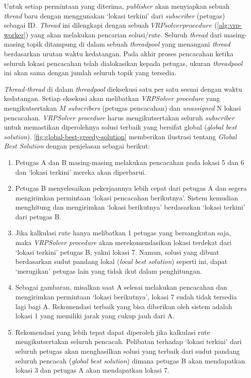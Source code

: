 Untuk setiap permintaan yang diterima, \textit{publisher} akan menyiapkan sebuah \textit{thread} baru dengan menggunakan `lokasi terkini' dari \textit{subscriber} (petugas) sebagai ID. \textit{Thread} ini dilengkapi dengan sebuah $VRP solver procedure$ (\autoref{alg:vrp-worker}) yang akan melakukan pencarian solusi/rute. Seluruh \textit{thread} dari masing-masing topik ditampung di dalam sebuah \textit{threadpool} yang menangani \textit{thread} berdasarkan urutan waktu kedatangan. Pada akhir proses pencacahan ketika seluruh lokasi pencacahan telah dialokasikan kepada petugas, ukuran \textit{threadpool} ini akan sama dengan jumlah seluruh topik yang tersedia. 


\textit{Thread-thread} di dalam \textit{threadpool} dieksekusi satu per satu sesuai dengan waktu kedatangan. Setiap eksekusi akan melibatkan \textit{VRPSolver procedure} yang mengikutsertakan $M$ \textit{subscribers} (petugas pencacahan) dan \textit{unassigned} N lokasi pencacahan. \textit{VRPSolver procedure} harus mengikutsertakan seluruh \textit{subscriber} untuk memastikan diperolehnya solusi terbaik yang bersifat global (\textit{global best solution}). \autoref{fig:global-best-greedy-solution} memberikan ilustrasi tentang \textit{Global Best Solution} dengan penjelasan sebagai berikut:
\begin{enumerate}
	\item Petugas A dan B masing-masing melakukan pencacahan pada lokasi 5 dan 6 dan `lokasi terkini' mereka akan diperbarui.
	\item Petugas B menyelesaikan pekerjaannya lebih cepat dari petugas A dan segera mengirimkan permintaan `lokasi pencacahan berikutnya'. Sistem kemudian menghitung dan mengirimkan `lokasi berikutnya' berdasarkan `lokasi terkini' dari petugas B. 
	\item Jika kalkulasi rute hanya melibatkan 1 petugas yang bersangkutan saja, maka \textit{VRPSolver procedure} akan merekomendasikan lokasi terdekat dari `lokasi terkini' petugas B, yakni lokasi 7. Namun, solusi yang dibuat berdasarkan sudut pandang lokal (\textit{local best solution}) seperti ini, dapat `merugikan' petugas lain yang tidak ikut dalam penghitungan. 
	\item Sebagai gambaran, misalkan saat A selesai melakukan pencacahan dan mengirimkan permintaan `lokasi berikutnya', lokasi 7 sudah tidak tersedia lagi bagi A. Rekomendasi terbaik yang bisa diberikan oleh sistem adalah lokasi 1 yang memiliki jarak yang cukup jauh dari A. 
	\item Rekomendasi yang lebih tepat dapat diperoleh jika kalkulasi rute mengikutsertakan seluruh pencacah. Pelibatan terhadap `lokasi terkini' dari seluruh petugas akan menghasilkan solusi yang terbaik dari sudut pandang seluruh pencacah (\textit{global best solution}) dimana petugas B akan mendapatkan lokasi 3 dan petugas A akan mendapatkan lokasi 7. 

\end{enumerate}

